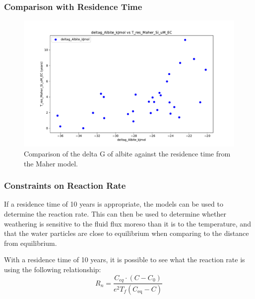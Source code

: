 \subsubsection{Comparison with Residence Time}




\begin{figure}[h]
    \centering
    \includegraphics[width=\textwidth]{deltag_Albite_kJmol_vs_T_res_Maher_Si_uM_EC.pdf}
    \caption{Comparison of the delta G of albite against the residence time from the Maher model.}
    \label{fig:discussion8}
\end{figure}

\FloatBarrier


\subsubsection{Constraints on Reaction Rate}


If a residence time of 10 years is appropriate, the models can be used to determine the reaction rate. This can then be used to determine whether weathering is sensitive to the fluid flux moreso than it is to the temperature, and that the water particles are close to equilibrium when comparing to the distance from equilibrium.

\bsk

With a residence time of 10 years, it is possible to see what the reaction rate is using the following relationship: \\

\begin{equation}
    R_n = \frac{C_{eq} \cdot \left(C - C_0\right)}{e^2 T_f \left( C_{\text{eq}} - C \right)}
\end{equation}\\

